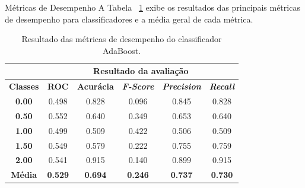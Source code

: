 \documentclass[10pt]{beamer}
\begin{document}
  \begin{frame}[fragile]{Métricas de Desempenho}
    A Tabela ~\ref{tab:evaluation_result} exibe os resultados das principais métricas de desempenho para classificadores e a média geral de cada métrica.

    \begin{table}[H]
    \centering
    \begin{tabular}{c|c|c|c|c|c|}
    \cline{2-6}
     & \multicolumn{5}{c|}{\textbf{Resultado da avaliação}} \\ \hline
    \multicolumn{1}{|c|}{\textbf{Classes}} & \textbf{ROC} & \textbf{Acurácia} & \textit{\textbf{F-Score}} & \textit{\textbf{Precision}} & \textit{\textbf{Recall}} \\ \hline
    \multicolumn{1}{|c|}{\textbf{0.00}}  & 0.498 & 0.828 & 0.096 & 0.845 & 0.828 \\ \hline
    \multicolumn{1}{|c|}{\textbf{0.50}}  & 0.552 & 0.640 & 0.349 & 0.653 & 0.640 \\ \hline
    \multicolumn{1}{|c|}{\textbf{1.00}}  & 0.499 & 0.509 & 0.422 & 0.506 & 0.509 \\ \hline
    \multicolumn{1}{|c|}{\textbf{1.50}}  & 0.549 & 0.579 & 0.222 & 0.755 & 0.759 \\ \hline
    \multicolumn{1}{|c|}{\textbf{2.00}}  & 0.541 & 0.915 & 0.140 & 0.899 & 0.915 \\ \hline
    \multicolumn{1}{|c|}{\textbf{Média}} & \textbf{0.529} & \textbf{0.694} & \textbf{0.246} & \textbf{0.737} & \textbf{0.730} \\ \hline
    \end{tabular}
    \caption{Resultado das métricas de desempenho do classificador AdaBoost.}
    \label{tab:evaluation_result}
    \end{table}
  \end{frame}
\end{document}
